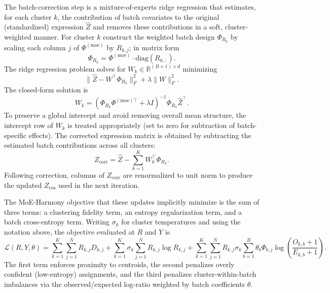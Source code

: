\documentclass{article}
\begin{document}
The batch-correction step is a mixture-of-experts ridge regression that estimates, for each cluster $k$, the contribution of batch covariates to the original (standardized) expression $\hat{Z}$ and removes these contributions in a soft, cluster-weighted manner. For cluster $k$ construct the weighted batch design $\Phi_{R_k}$ by scaling each column $j$ of $\Phi^{(\mathrm{moe})}$ by $R_{k,j}$; in matrix form
\begin{equation}
    \Phi_{R_k} = \Phi^{(\mathrm{moe})} \cdot \mathrm{diag}(R_{k,:}).
\end{equation}
The ridge regression problem solves for $W_k \in \mathbb{R}^{(B+1) \times d}$ minimizing
\begin{equation}
    \| \hat{Z} - W^\top \Phi_{R_k} \|_F^2 + \lambda \|W\|_F^2.
\end{equation}
The closed-form solution is
\begin{equation}
    W_k = \left( \Phi_{R_k} \Phi^{(\mathrm{moe})\top} + \lambda I \right)^{-1} \Phi_{R_k} \hat{Z}^\top.
\end{equation}
To preserve a global intercept and avoid removing overall mean structure, the intercept row of $W_k$ is treated appropriately (set to zero for subtraction of batch-specific effects). The corrected expression matrix is obtained by subtracting the estimated batch contributions across all clusters:
\begin{equation}
    Z_{\mathrm{corr}} = \hat{Z} - \sum_{k=1}^K W_k^\top \Phi_{R_k}.
\end{equation}
Following correction, columns of $Z_{\mathrm{corr}}$ are renormalized to unit norm to produce the updated $Z_{\mathrm{cos}}$ used in the next iteration.

The MoE-Harmony objective that these updates implicitly minimize is the sum of three terms: a clustering fidelity term, an entropy regularization term, and a batch cross-entropy term. Writing $\sigma_k$ for cluster temperatures and using the notation above, the objective evaluated at $R$ and $Y$ is
\begin{equation}
    \mathcal{L}(R,Y,\theta) = \sum_{k=1}^K \sum_{j=1}^N R_{k,j} D_{k,j} + \sum_{k=1}^K \sigma_k \sum_{j=1}^N R_{k,j} \log R_{k,j} + \sum_{k=1}^K \sum_{j=1}^N R_{k,j} \sigma_k \sum_{b=1}^B \theta_b \Phi_{b,j} \log \left(\frac{O_{k,b} + 1}{E_{k,b} + 1}\right).
\end{equation}
The first term enforces proximity to centroids, the second penalizes overly confident (low-entropy) assignments, and the third penalizes cluster-within-batch imbalances via the observed/expected log-ratio weighted by batch coefficients $\theta$.
\end{document}
